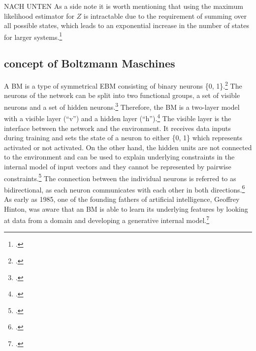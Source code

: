NACH UNTEN
As a side note it is worth mentioning that using the maximum likelihood estimator for \( Z \) is intractable due to the requirement of summing over all possible states, which leads to an exponential increase in the number of states for larger systems.\footcite[cf.][2-3]{zhaiDeepStructuredEnergy2016}

\subsection{concept of Boltzmann Maschines}

A \ac{BM} is a type of symmetrical \ac{EBM} consisting of binary neurons \{0, 1\}.\footcite[cf.][260]{amariInformationGeometryBoltzmann1992}
The neurons of the network can be split into two functional groups, a set of visible neurons and a set of hidden neurons.\footcite[cf.][154]{ackleyLearningAlgorithmBoltzmann1985}
Therefore, the \ac{BM} is a two-layer model with a visible layer (``v'') and a hidden layer (``h'').\footcite[cf.][448]{salakhutdinovDeepBoltzmannMachines2009}
The visible layer is the interface between the network and the environment. It receives data inputs during training and sets the state of a neuron to either \{0, 1\} which represents activated or not activated.
On the other hand, the hidden units are not connected to the environment and can be used to explain underlying constraints in the internal model of input vectors and they cannot be represented by pairwise constraints.\footcite[cf.][154]{ackleyLearningAlgorithmBoltzmann1985}
The connection between the individual neurons is referred to as bidirectional, as each neuron communicates with each other in both directions.\footcite[cf.][149]{ackleyLearningAlgorithmBoltzmann1985}
As early as 1985, one of the founding fathers of artificial intelligence, Geoffrey Hinton, was aware that an \ac{BM} is able to learn its underlying features by looking at data from a domain and developing a generative internal model.\footcite[cf.][148]{ackleyLearningAlgorithmBoltzmann1985}

